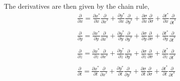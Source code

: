 \documentclass[oribibl]{llncs}
\begin{document}
The derivatives are then given by the chain rule,
\begin{eqnarray}
\frac{\partial}{\partial x} = \frac{\partial x^*}{\partial x} \frac{\partial}{\partial x^*} +  \frac{\partial y^*}{\partial x} \frac{\partial}{\partial y^*} +  \frac{\partial \sigma}{\partial x} \frac{\partial}{\partial \sigma} +  \frac{\partial t^*}{\partial x} \frac{\partial}{\partial t^*}  \\ \nonumber \\ 
\frac{\partial}{\partial y} = \frac{\partial x^*}{\partial y} \frac{\partial}{\partial x^*} +  \frac{\partial y^*}{\partial y} \frac{\partial}{\partial y^*} +  \frac{\partial \sigma}{\partial y} \frac{\partial}{\partial \sigma} +  \frac{\partial t^*}{\partial y} \frac{\partial}{\partial t^*} \\ \nonumber \\
\frac{\partial}{\partial z} = \frac{\partial x^*}{\partial z} \frac{\partial}{\partial x^*} +  \frac{\partial y^*}{\partial z} \frac{\partial}{\partial y^*} +  \frac{\partial \sigma}{\partial z} \frac{\partial}{\partial \sigma} +  \frac{\partial t^*}{\partial z} \frac{\partial}{\partial t^*} \\ \nonumber \\ 
\frac{\partial}{\partial t} = \frac{\partial x^*}{\partial t} \frac{\partial}{\partial x^*} +  \frac{\partial y^*}{\partial t} \frac{\partial}{\partial y^*} +  \frac{\partial \sigma}{\partial t} \frac{\partial}{\partial \sigma} +  \frac{\partial t^*}{\partial t} \frac{\partial}{\partial t^*}
\end{eqnarray}
\end{document}
